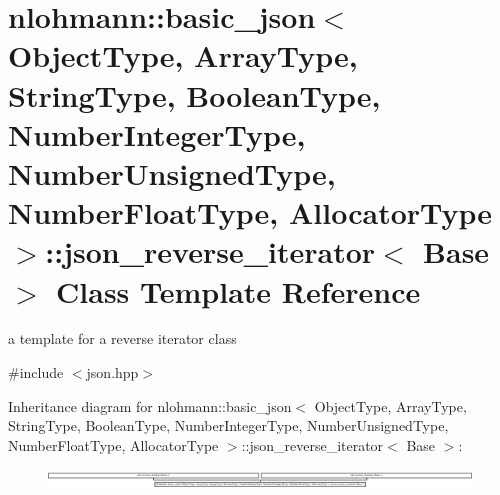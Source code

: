 \hypertarget{classnlohmann_1_1basic__json_1_1json__reverse__iterator}{\section{nlohmann\-:\-:basic\-\_\-json$<$ Object\-Type, Array\-Type, String\-Type, Boolean\-Type, Number\-Integer\-Type, Number\-Unsigned\-Type, Number\-Float\-Type, Allocator\-Type $>$\-:\-:json\-\_\-reverse\-\_\-iterator$<$ Base $>$ Class Template Reference}
\label{classnlohmann_1_1basic__json_1_1json__reverse__iterator}
}


a template for a reverse iterator class  




{\ttfamily \#include $<$json.\-hpp$>$}

Inheritance diagram for nlohmann\-:\-:basic\-\_\-json$<$ Object\-Type, Array\-Type, String\-Type, Boolean\-Type, Number\-Integer\-Type, Number\-Unsigned\-Type, Number\-Float\-Type, Allocator\-Type $>$\-:\-:json\-\_\-reverse\-\_\-iterator$<$ Base $>$\-:\begin{figure}[H]
\begin{center}
\leavevmode
\includegraphics[height=0.518039cm]{classnlohmann_1_1basic__json_1_1json__reverse__iterator}
\end{center}
\end{figure}
